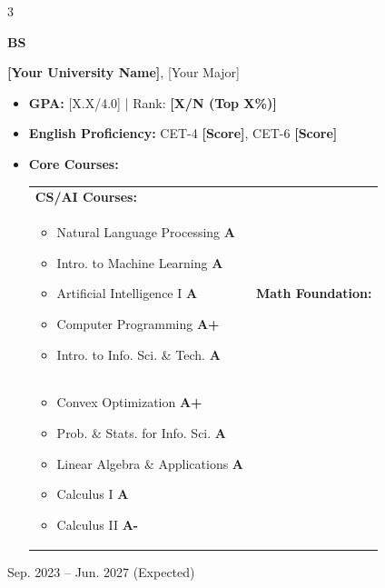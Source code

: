 \documentclass[10pt, letterpaper]{article}
\newenvironment{highlights}{
    \begin{itemize}[
        topsep=0.10 cm,
        parsep=0.10 cm,
        partopsep=0pt,
        itemsep=0pt,
        leftmargin=0.4 cm + 10pt
    ]
}{\end{itemize}} %
\newenvironment{threecolentry}[3][]{\onecolentry
    \def\thirdColumn{#3}
    \setcolumnwidth{1 cm, \fill, 4.5 cm}
    \begin{paracol}{3}
    {\raggedright #2} \switchcolumn
}{\switchcolumn \raggedleft \thirdColumn
    \end{paracol}
    \endonecolentry} %
\begin{document}
        \begin{threecolentry}{\textbf{BS}}{        
            Sep. 2023 -- Jun. 2027 (Expected)
        }
            \textbf{[Your University Name]}, [Your Major]
            \begin{highlights}
                \item \textbf{GPA:} [X.X/4.0] | Rank: \textbf{[X/N (Top X\%)]} %
                \item \textbf{English Proficiency:} CET-4 \textbf{[Score]}, CET-6 \textbf{[Score]} %
                \item \textbf{Core Courses:}\par\vspace{0.05cm}
                \begin{tabularx}{\linewidth}{@{}>{\raggedright\arraybackslash}X >{\raggedright\arraybackslash}X@{}}
                    \textbf{CS/AI Courses:} \\
                    \begin{itemize}[topsep=0.05cm, itemsep=0pt, leftmargin=0.8em]
                        \item Natural Language Processing \hfill \textbf{A}
                        \item Intro. to Machine Learning \hfill \textbf{A}
                        \item Artificial Intelligence I \hfill \textbf{A}
                        \item Computer Programming \hfill \textbf{A+}
                        \item Intro. to Info. Sci. \& Tech. \hfill \textbf{A}
                    \end{itemize}
                    &
                    \textbf{Math Foundation:} \\
                    \begin{itemize}[topsep=0.05cm, itemsep=0pt, leftmargin=0.8em]
                        \item Convex Optimization \hfill \textbf{A+}
                        \item Prob. \& Stats. for Info. Sci. \hfill \textbf{A}
                        \item Linear Algebra \& Applications \hfill \textbf{A}
                        \item Calculus I \hfill \textbf{A}
                        \item Calculus II \hfill \textbf{A-}
                    \end{itemize}
                \end{tabularx}
            \end{highlights}
        \end{threecolentry}
\end{document}
